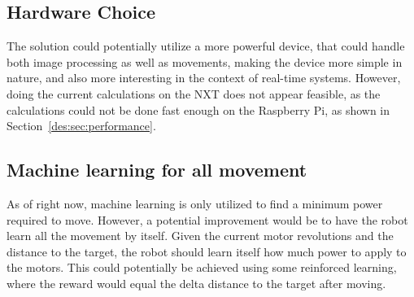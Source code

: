 \subsection{Hardware Choice}
The solution could potentially utilize a more powerful device, that could handle both image processing as well as movements, making the device more simple in nature, and also more interesting in the context of real-time systems.
However, doing the current calculations on the NXT does not appear feasible, as the calculations could not be done fast enough on the Raspberry Pi, as shown in Section~\ref{des:sec:performance}.
 
\subsection{Machine learning for all movement}
As of right now, machine learning is only utilized to find a minimum power required to move.
However, a potential improvement would be to have the robot learn all the movement by itself.
Given the current motor revolutions and the distance to the target, the robot should learn itself how much power to apply to the motors.
This could potentially be achieved using some reinforced learning, where the reward would equal the delta distance to the target after moving.
